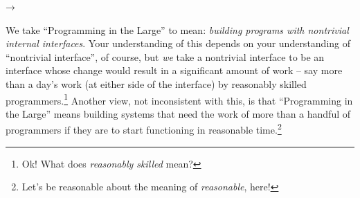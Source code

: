 \documentclass{ip3}
\begin{document}
→

        



\begin{foil}

\begin{note}
      We take ``Programming in the Large'' to mean: \textit{building
      programs with nontrivial internal interfaces}. Your understanding of
      this depends on your understanding of ``nontrivial interface'', of
      course, but \textit{we} take a nontrivial interface to be an
      interface whose change would result in a significant amount of work
      -- say more than a day's work (at either side of the interface) by
      reasonably skilled programmers.\footnote{Ok! What does
      \textit{reasonably skilled} mean?} Another view, not inconsistent
      with this, is that ``Programming in the Large'' means building
      systems that need the work of more than a handful of programmers if
      they are to start functioning in reasonable time.\footnote{Let's be
      reasonable about the meaning of \textit{reasonable}, here!}

\end{note}


\end{foil}
\end{document}
